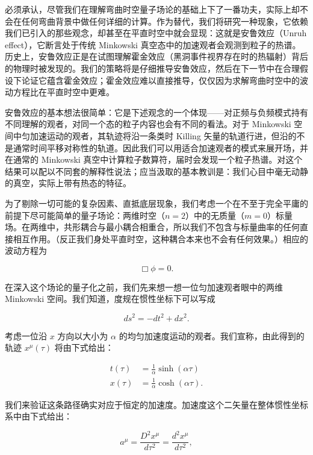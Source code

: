 必须承认，尽管我们在理解弯曲时空量子场论的基础上下了一番功夫，实际上却不会在任何弯曲背景中做任何详细的计算。作为替代，我们将研究一种现象，它依赖我们已引入的那些观念，却甚至在平直时空中就会显现：这就是安鲁效应（Unruh effect），它断言处于传统 Minkowski 真空态中的加速观者会观测到粒子的热谱。历史上，安鲁效应正是在试图理解霍金效应（黑洞事件视界存在时的热辐射）背后的物理时被发现的。我们的策略将是仔细推导安鲁效应，然后在下一节中在合理假设下论证它蕴含霍金效应；霍金效应难以直接推导，仅仅因为求解弯曲时空中的波动方程比在平直时空中更难。

安鲁效应的基本想法很简单：它是下述观念的一个体现——对正频与负频模式持有不同理解的观者，对同一个态的粒子内容也会有不同的看法。对于 Minkowski 空间中匀加速运动的观者，其轨迹将沿一条类时 Killing 矢量的轨道行进，但沿的不是通常时间平移对称性的轨道。因此我们可以用适合加速观者的模式来展开场，并在通常的 Minkowski 真空中计算粒子数算符，届时会发现一个粒子热谱。对这个结果可以配以不同套的解释性说法；应当汲取的基本教训是：我们心目中毫无动静的真空，实际上带有热态的特征。

为了剔除一切可能的复杂因素、直抵底层现象，我们考虑一个在不至于完全平庸的前提下尽可能简单的量子场论：两维时空（$n=2$）中的无质量（$m=0$）标量场。在两维中，共形耦合与最小耦合相重合，所以我们不包含与标量曲率的任何直接相互作用。（反正我们身处平直时空，这种耦合本来也不会有任何效果。）相应的波动方程为

\begin{equation*}
\Box\phi = 0.
\tag{9.124}
\end{equation*}

在深入这个场论的量子化之前，我们先来想一想一位匀加速观者眼中的两维 Minkowski 空间。我们知道，度规在惯性坐标下可以写成

\begin{equation*}
ds^2 = -dt^2 + dx^2.
\tag{9.125}
\end{equation*}

考虑一位沿 $x$ 方向以大小为 $\alpha$ 的均匀加速度运动的观者。我们宣称，由此得到的轨迹 $x^{\mu}(\tau)$ 将由下式给出：

\begin{align*}
t(\tau) &= \frac{1}{\alpha}\sinh(\alpha\tau) \\
x(\tau) &= \frac{1}{\alpha}\cosh(\alpha\tau).
\tag{9.126}
\end{align*}

我们来验证这条路径确实对应于恒定的加速度。加速度这个二矢量在整体惯性坐标系中由下式给出：

\begin{equation*}
a^{\mu} = \frac{D^2 x^{\mu}}{d\tau^2} = \frac{d^2 x^{\mu}}{d\tau^2},
\tag{9.127}
\end{equation*}

